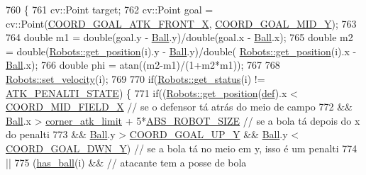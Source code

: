 \begin{DoxyCode}
760                                 \{
761     cv::Point target;
762     cv::Point goal = cv::Point(\hyperlink{namespace_c_o_n_s_t_a8788c5d888fd3e9d9382502aee24afee}{COORD\_GOAL\_ATK\_FRONT\_X}, 
      \hyperlink{namespace_c_o_n_s_t_a227a51bc8809f1391dc096eafb6b1d85}{COORD\_GOAL\_MID\_Y});
763 
764     \textcolor{keywordtype}{double} m1 = double(goal.y - \hyperlink{class_strategy_abd16b6276e747f6cd99a19963ff5495b}{Ball}.y)/double(goal.x - \hyperlink{class_strategy_abd16b6276e747f6cd99a19963ff5495b}{Ball}.x);
765     \textcolor{keywordtype}{double} m2 = double(\hyperlink{class_robots_a1fca8f2f5070176faa6ba1efa2f1ff14}{Robots::get\_position}(i).y - \hyperlink{class_strategy_abd16b6276e747f6cd99a19963ff5495b}{Ball}.y)/double(
      \hyperlink{class_robots_a1fca8f2f5070176faa6ba1efa2f1ff14}{Robots::get\_position}(i).x - \hyperlink{class_strategy_abd16b6276e747f6cd99a19963ff5495b}{Ball}.x);
766     \textcolor{keywordtype}{double} phi = atan((m2-m1)/(1+m2*m1));
767 
768     \hyperlink{class_robots_ae37da9b7ca9d84bee564c328db139758}{Robots::set\_velocity}(i);
769 
770     \textcolor{keywordflow}{if}(\hyperlink{class_robots_abb471ba5ef5331f0488a9490d1af0c86}{Robots::get\_status}(i) != \hyperlink{strategy_8cpp_af9daa148169d5771f87d930a1a1a2c04}{ATK\_PENALTI\_STATE}) \{
771         \textcolor{keywordflow}{if}((\hyperlink{class_robots_a1fca8f2f5070176faa6ba1efa2f1ff14}{Robots::get\_position}(\hyperlink{class_strategy_ade11a007d9479832ddc5e69169e23692}{def}).x < 
      \hyperlink{namespace_c_o_n_s_t_ad21da2e838c0a8da29db74cba008cf46}{COORD\_MID\_FIELD\_X} \textcolor{comment}{// se o defensor tá atrás do meio de campo}
772             && \hyperlink{class_strategy_abd16b6276e747f6cd99a19963ff5495b}{Ball}.x > \hyperlink{namespace_c_o_n_s_t_a2dae2bbcbbd0735ad1544509929d1c8f}{corner\_atk\_limit} + 5*\hyperlink{namespace_c_o_n_s_t_a8d0d7fe4341b9129cabd565ef16a0640}{ABS\_ROBOT\_SIZE}  \textcolor{comment}{// se a bola
       tá depois do x do penalti}
773             && \hyperlink{class_strategy_abd16b6276e747f6cd99a19963ff5495b}{Ball}.y > \hyperlink{namespace_c_o_n_s_t_ab1e77f62ff88d04c9aac407f4405add2}{COORD\_GOAL\_UP\_Y} && \hyperlink{class_strategy_abd16b6276e747f6cd99a19963ff5495b}{Ball}.y < 
      \hyperlink{namespace_c_o_n_s_t_a97382a534273f1ca10b7cdf29fab9d0a}{COORD\_GOAL\_DWN\_Y}) \textcolor{comment}{// se a bola tá no meio em y, isso é um penalti}
774             ||
775             (\hyperlink{class_strategy_af607e7b52f48a6c490549898e752fda2}{has\_ball}(i) && \textcolor{comment}{// atacante tem a posse de bola}

\end{DoxyCode}
